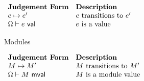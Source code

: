 \vspace{10px}
$\begin{array}{ll}
\textbf{Judgement Form} & \textbf{Description}\\
e \mapsto e' & \text{$e$ transitions to $e'$}\\
\Omega \vdash e~\mathsf{val} & \text{$e$ is a value}
\end{array}$
\vspace{10px}

Modules

\vspace{10px}
$\begin{array}{ll}
\textbf{Judgement Form} & \textbf{Description}\\
M \mapsto M' & \text{$M$ transitions to $M'$}\\
\Omega \vdash M~\mathsf{mval} & \text{$M$ is a module value}
\end{array}$
\vspace{10px}

